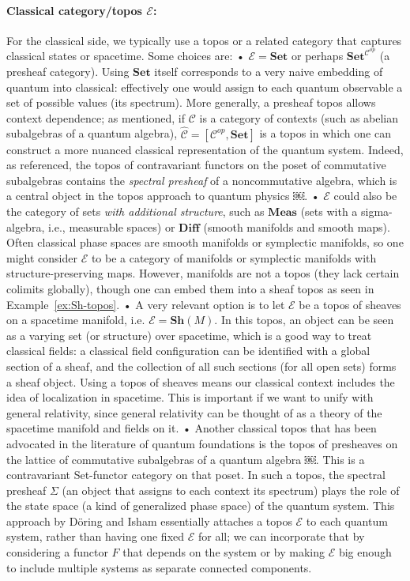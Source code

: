 \paragraph{Classical category/topos $\mathcal{E}$:} For the classical side, we typically use a topos or a related category that captures classical states or spacetime. Some choices are:
	•	$\mathcal{E} = \mathbf{Set}$ or perhaps $\mathbf{Set}^{\mathcal{C}^{op}}$ (a presheaf category). Using $\mathbf{Set}$ itself corresponds to a very naive embedding of quantum into classical: effectively one would assign to each quantum observable a set of possible values (its spectrum). More generally, a presheaf topos allows context dependence; as mentioned, if $\mathcal{C}$ is a category of contexts (such as abelian subalgebras of a quantum algebra), $\widehat{\mathcal{C}} = [\mathcal{C}^{op}, \mathbf{Set}]$ is a topos in which one can construct a more nuanced classical representation of the quantum system. Indeed, as referenced, the topos of contravariant functors on the poset of commutative subalgebras contains the \emph{spectral presheaf} of a noncommutative algebra, which is a central object in the topos approach to quantum physics ￼.
	•	$\mathcal{E}$ could also be the category of sets \textit{with additional structure}, such as $\mathbf{Meas}$ (sets with a sigma-algebra, i.e., measurable spaces) or $\mathbf{Diff}$ (smooth manifolds and smooth maps). Often classical phase spaces are smooth manifolds or symplectic manifolds, so one might consider $\mathcal{E}$ to be a category of manifolds or symplectic manifolds with structure-preserving maps. However, manifolds are not a topos (they lack certain colimits globally), though one can embed them into a sheaf topos as seen in Example~\ref{ex:Sh-topos}.
	•	A very relevant option is to let $\mathcal{E}$ be a topos of sheaves on a spacetime manifold, i.e. $\mathcal{E} = \mathbf{Sh}(M)$. In this topos, an object can be seen as a varying set (or structure) over spacetime, which is a good way to treat classical fields: a classical field configuration can be identified with a global section of a sheaf, and the collection of all such sections (for all open sets) forms a sheaf object. Using a topos of sheaves means our classical context includes the idea of localization in spacetime. This is important if we want to unify with general relativity, since general relativity can be thought of as a theory of the spacetime manifold and fields on it.
	•	Another classical topos that has been advocated in the literature of quantum foundations is the topos of presheaves on the lattice of commutative subalgebras of a quantum algebra ￼. This is a contravariant Set-functor category on that poset. In such a topos, the spectral presheaf $\Sigma$ (an object that assigns to each context its spectrum) plays the role of the state space (a kind of generalized phase space) of the quantum system. This approach by Döring and Isham essentially attaches a topos $\mathcal{E}$ to each quantum system, rather than having one fixed $\mathcal{E}$ for all; we can incorporate that by considering a functor $F$ that depends on the system or by making $\mathcal{E}$ big enough to include multiple systems as separate connected components.

